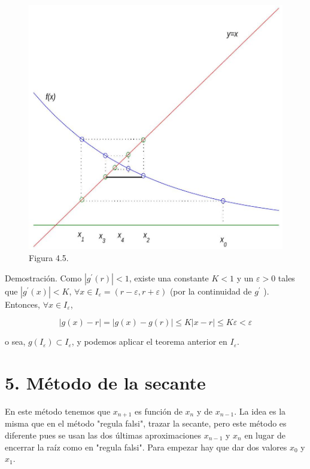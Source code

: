 \documentclass[10pt]{article}
\begin{document}
\begin{figure}[h]
\begin{center}
  \includegraphics[width=\textwidth]{2025_09_05_3888c9ac96bd653d96b4g-083}
\captionsetup{labelformat=empty}
\caption{Figura 4.5.}
\end{center}
\end{figure}

Demostración. Como $\left|g^{\prime}(r)\right|<1$, existe una constante $K<1$ y un $\varepsilon>0$ tales que $\left|g^{\prime}(x)\right|<K$, $\forall x \in I_{\varepsilon}=(r-\varepsilon, r+\varepsilon)$ (por la continuidad de $g^{\prime}$ ). Entonces, $\forall x \in I_{\varepsilon}$,

$$
|g(x)-r|=|g(x)-g(r)| \leq K|x-r| \leq K \varepsilon<\varepsilon
$$

o sea, $g\left(I_{\varepsilon}\right) \subset I_{\varepsilon}$, y podemos aplicar el teorema anterior en $I_{\varepsilon}$.

\section*{5. Método de la secante}
En este método tenemos que $x_{n+1}$ es función de $x_{n}$ y de $x_{n-1}$. La idea es la misma que en el método "regula falsi", trazar la secante, pero este método es diferente pues se usan las dos últimas aproximaciones $x_{n-1}$ y $x_{n}$ en lugar de encerrar la raíz como en "regula falsi". Para empezar hay que dar dos valores $x_{0}$ y $x_{1}$.
\end{document}
